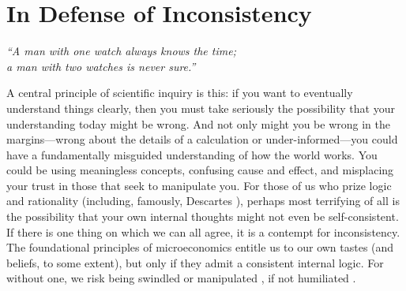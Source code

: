 

\section{In Defense of Inconsistency}

\begin{center}
    \noindent\singlespacingplus
    \it
    ``A man with one watch always knows the time;\\
    a man with two watches is never sure.''
\end{center}

%
A central principle of scientific inquiry is this:
    if you want to eventually understand things clearly, then you must take seriously the possibility that your understanding today might be wrong. 
And not only might you be wrong in the margins---wrong about the details of a calculation or under-informed---you could have a fundamentally misguided understanding of how the world works. You could be using meaningless concepts, confusing cause and effect, and misplacing your trust in those that seek to manipulate you. 
For those of us who prize logic and rationality (including, famously, Descartes \cite{descartes}), perhaps most terrifying of all is the possibility that your own internal thoughts might not even be self-consistent.
If there is one thing on which we can all agree, it is a contempt for inconsistency.
The foundational principles of microeconomics entitle us to our own tastes (and beliefs, to some extent), but only if they admit a consistent internal logic.
For without one, we risk being swindled \cite{RAT} or manipulated \cite{explosion}, if not humiliated \cite{logicalfalacy,emptysetthesis,politicians}.

